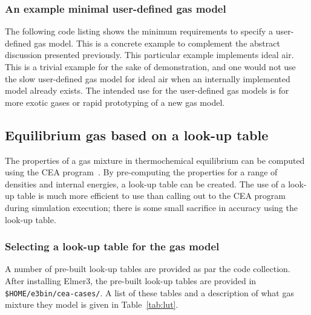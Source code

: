 \subsubsection{An example minimal user-defined gas model}
The following code listing shows the minimum requirements to specify
a user-defined gas model.
This is a concrete example to complement the abstract discussion presented
previously.
This particular example implements ideal air.
This is a trivial example for the sake of demonstration, and one would not use the slow user-defined gas model
for ideal air when an internally implemented model already exists.
The intended use for the user-defined gas models is for more exotic gases or rapid prototyping
of a new gas model.

\noindent
\topbar

\bottombar

\subsection{Equilibrium gas based on a look-up table}
The properties of a gas mixture in thermochemical equilibrium can be computed using the 
CEA program~\cite{gordon_mcbride_1994, mcbride_gordon_1996}.
By pre-computing the properties for a range of densities and internal energies,
a look-up table can be created.
The use of a look-up table is much more efficient to use than calling out to the CEA program during 
simulation execution; there is some small sacrifice in accuracy using the look-up table.

\subsubsection{Selecting a look-up table for the gas model}
A number of pre-built look-up tables are provided as par the code collection.
After installing Elmer3, the pre-built look-up tables are provided in \texttt{\$HOME/e3bin/cea-cases/}.
A list of these tables and a description of what gas mixture they model is given in 
Table~\ref{tab:lut}.

